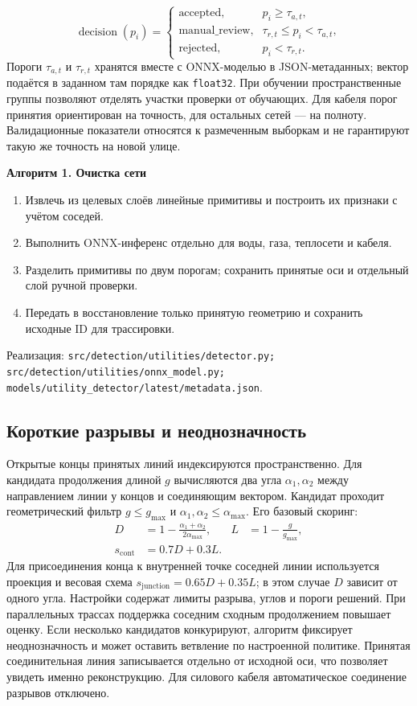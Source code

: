 \documentclass[11pt,a4paper]{article}
\newcommand{\code}[1]{\texttt{#1}}
\newcommand{\src}[1]{\par{\small\color{muted}Реализация: \texttt{#1}.}\par}
\newcommand{\alg}[1]{\medskip\noindent\colorbox{pale}{\parbox{\dimexpr\linewidth-2\fboxsep}{\textbf{#1}}}\smallskip}
\begin{document}
\begin{equation}
\operatorname{decision}(p_i)=
\begin{cases}
\text{accepted}, & p_i\ge \tau_{a,t},\\
\text{manual\_review}, & \tau_{r,t}\le p_i<\tau_{a,t},\\
\text{rejected}, & p_i<\tau_{r,t}.
\end{cases}
\end{equation}
Пороги $\tau_{a,t}$ и $\tau_{r,t}$ хранятся вместе с ONNX-моделью в JSON-метаданных; вектор подаётся в заданном там порядке как \code{float32}. При обучении пространственные группы позволяют отделять участки проверки от обучающих. Для кабеля порог принятия ориентирован на точность, для остальных сетей --- на полноту. Валидационные показатели относятся к размеченным выборкам и не гарантируют такую же точность на новой улице.

\alg{Алгоритм 1. Очистка сети}
\begin{enumerate}
\item Извлечь из целевых слоёв линейные примитивы и построить их признаки с учётом соседей.
\item Выполнить ONNX-инференс отдельно для воды, газа, теплосети и кабеля.
\item Разделить примитивы по двум порогам; сохранить принятые оси и отдельный слой ручной проверки.
\item Передать в восстановление только принятую геометрию и сохранить исходные ID для трассировки.
\end{enumerate}
\src{src/detection/utilities/detector.py;\\ src/detection/utilities/onnx\_model.py; models/utility\_detector/latest/metadata.json}

\subsection{Короткие разрывы и неоднозначность}
Открытые концы принятых линий индексируются пространственно. Для кандидата продолжения длиной $g$ вычисляются два угла $\alpha_1,\alpha_2$ между направлением линии у концов и соединяющим вектором. Кандидат проходит геометрический фильтр $g\le g_{\max}$ и $\alpha_1,\alpha_2\le\alpha_{\max}$. Его базовый скоринг:
\begin{align}
D&=1-\frac{\alpha_1+\alpha_2}{2\alpha_{\max}}, & L&=1-\frac{g}{g_{\max}},\\
s_{\mathrm{cont}}&=0.7D+0.3L.&&
\end{align}
Для присоединения конца к внутренней точке соседней линии используется проекция и весовая схема $s_{\mathrm{junction}}=0.65D+0.35L$; в этом случае $D$ зависит от одного угла. Настройки содержат лимиты разрыва, углов и пороги решений. При параллельных трассах поддержка соседним сходным продолжением повышает оценку. Если несколько кандидатов конкурируют, алгоритм фиксирует неоднозначность и может оставить ветвление по настроенной политике. Принятая соединительная линия записывается отдельно от исходной оси, что позволяет увидеть именно реконструкцию. Для силового кабеля автоматическое соединение разрывов отключено.
\end{document}

